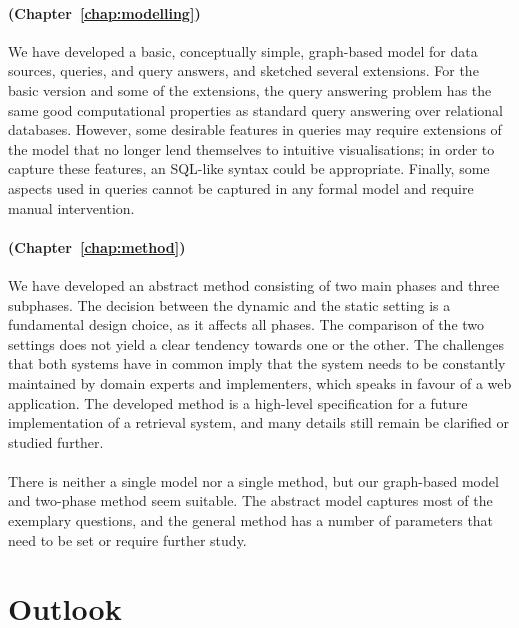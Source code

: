 \paragraph{\RQ[4] (Chapter~\ref{chap:modelling})}

We have developed a basic, conceptually simple, graph-based model for data sources, queries, and query answers,
and sketched several extensions. For the basic version and some of the extensions,
the query answering problem has the same
good computational properties as standard query answering over relational databases.
However, some desirable features in queries may require extensions of the model that no longer lend themselves
to intuitive visualisations; in order to capture these features, an \gls{SQL}-like syntax could be appropriate.
Finally, some aspects used in queries cannot be captured in any formal model
and require manual intervention.

\paragraph{\RQ[5] (Chapter~\ref{chap:method})}

We have developed an abstract method consisting of two main phases and three subphases.
The decision between the dynamic and the static setting is a fundamental design choice,
as it affects all phases. The comparison of the two settings does not yield a clear tendency
towards one or the other. The challenges that both systems have in common imply
that the system needs to be constantly maintained by domain experts and implementers,
which speaks in favour of a web application.
The developed method is a high-level specification for a future implementation of a retrieval system,
and many details still remain be clarified or studied further.

\paragraph{\RQ}

There is neither a single model nor a single method,
but our graph-based model and two-phase method seem suitable.
The abstract model captures most of the exemplary questions, 
and the general method has a number of parameters
that need to be set or require further study.

\section{Outlook}
\label{sec:outlook}

